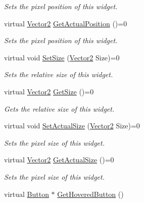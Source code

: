 \begin{DoxyCompactItemize}
\begin{DoxyCompactList}\small\item\em Sets the pixel position of this widget. \item\end{DoxyCompactList}\item 
virtual \hyperlink{classphys_1_1Vector2}{Vector2} \hyperlink{classphys_1_1UI_1_1Widget_a0a29fecff7f56d7909f65fd63b0990e7}{GetActualPosition} ()=0
\begin{DoxyCompactList}\small\item\em Sets the pixel position of this widget. \item\end{DoxyCompactList}\item 
virtual void \hyperlink{classphys_1_1UI_1_1Widget_ad5af5f04b60d43341037df6b0e329bbd}{SetSize} (\hyperlink{classphys_1_1Vector2}{Vector2} Size)=0
\begin{DoxyCompactList}\small\item\em Sets the relative size of this widget. \item\end{DoxyCompactList}\item 
virtual \hyperlink{classphys_1_1Vector2}{Vector2} \hyperlink{classphys_1_1UI_1_1Widget_a07039c19e57de314147ce066417da0a2}{GetSize} ()=0
\begin{DoxyCompactList}\small\item\em Gets the relative size of this widget. \item\end{DoxyCompactList}\item 
virtual void \hyperlink{classphys_1_1UI_1_1Widget_a8ceb54fd067847844b314dedd8e529f8}{SetActualSize} (\hyperlink{classphys_1_1Vector2}{Vector2} Size)=0
\begin{DoxyCompactList}\small\item\em Sets the pixel size of this widget. \item\end{DoxyCompactList}\item 
virtual \hyperlink{classphys_1_1Vector2}{Vector2} \hyperlink{classphys_1_1UI_1_1Widget_af3a685621ed220748c0940ea38c96ed2}{GetActualSize} ()=0
\begin{DoxyCompactList}\small\item\em Sets the pixel size of this widget. \item\end{DoxyCompactList}\item 
virtual \hyperlink{classphys_1_1UI_1_1Button}{Button} $\ast$ \hyperlink{classphys_1_1UI_1_1Widget_ab563c13db418e4c3ff0a0dd766550251}{GetHoveredButton} ()

\end{DoxyCompactItemize}
